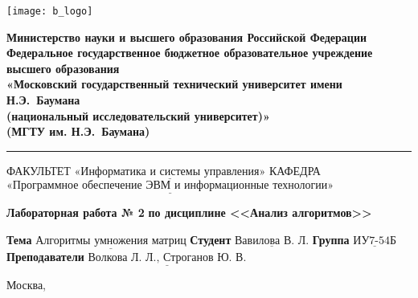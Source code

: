 \thispagestyle{empty}

\noindent \begin{minipage}{0.15\textwidth}
	\texttt{[image: b\_logo]}
\end{minipage}
\noindent\begin{minipage}{0.85\textwidth}\centering
	\textbf{Министерство науки и высшего образования Российской Федерации}\\
	\textbf{Федеральное государственное бюджетное образовательное учреждение высшего образования}\\
	\textbf{«Московский государственный технический университет имени Н.Э.~Баумана}\\
	\textbf{(национальный исследовательский университет)»}\\
	\textbf{(МГТУ им. Н.Э.~Баумана)}
\end{minipage}

\noindent\rule{\linewidth}{3pt}
\newline\newline
\noindent ФАКУЛЬТЕТ $\underline{\text{«Информатика и системы управления»}}$ \newline\newline
\noindent КАФЕДРА $\underline{\text{«Программное обеспечение ЭВМ и информационные технологии»}}$

\vspace{1cm}

\begin{center}
	\noindent\begin{minipage}{1.3\textwidth}\centering
		\Large\textbf{  Лабораторная работа № 2}\newline
		\textbf{по дисциплине <<Анализ алгоритмов>>}\newline\newline
	\end{minipage}
\end{center}

\noindent\textbf{Тема} $\underline{\text{Алгоритмы умножения матриц}}$\newline\newline
\noindent\textbf{Студент} $\underline{\text{Вавилова В. Л.}}$\newline\newline
\noindent\textbf{Группа} $\underline{\text{ИУ7-54Б}}$\newline\newline
\noindent\textbf{Преподаватели} $\underline{\text{Волкова Л. Л., Строганов Ю. В.}}$\newline

\begin{center}
	\vfill
	Москва,~\the\year
\end{center}
\clearpage
